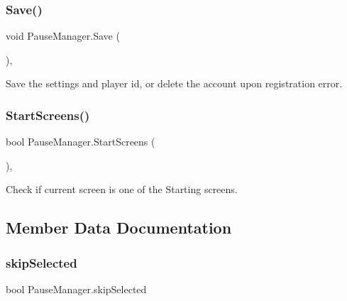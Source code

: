 \subsubsection{\texorpdfstring{Save()}{Save()}}
{\footnotesize\ttfamily void Pause\+Manager.\+Save (\begin{DoxyParamCaption}{ }\end{DoxyParamCaption})\hspace{0.3cm}{\ttfamily [inline]}, {\ttfamily [private]}}



Save the settings and player id, or delete the account upon registration error. 

\mbox{\label{class_pause_manager_a9a9453e92a60de1d20cf37c9e55ded0d}} 
\subsubsection{\texorpdfstring{StartScreens()}{StartScreens()}}
{\footnotesize\ttfamily bool Pause\+Manager.\+Start\+Screens (\begin{DoxyParamCaption}{ }\end{DoxyParamCaption})\hspace{0.3cm}{\ttfamily [inline]}, {\ttfamily [private]}}



Check if current screen is one of the Starting screens. 



\subsection{Member Data Documentation}
\mbox{\label{class_pause_manager_a2d11f4fd49f97bd8ede5f9e0afda9601}} 
\subsubsection{\texorpdfstring{skipSelected}{skipSelected}}
{\footnotesize\ttfamily bool Pause\+Manager.\+skip\+Selected\hspace{0.3cm}{\ttfamily [private]}}

\mbox{\label{class_pause_manager_a01e84a6aa94c2e746f047af9dcb5a04c}} 
